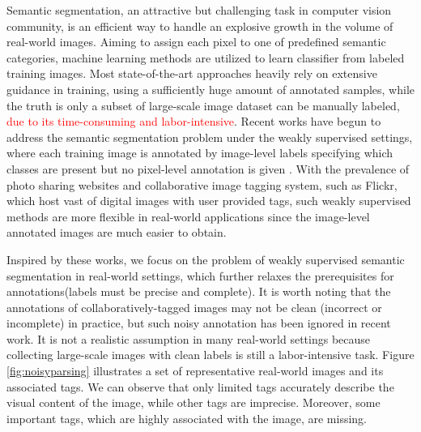 Semantic segmentation, an attractive but challenging task in computer vision community, is an efficient way to handle an explosive growth in the volume of real-world images. Aiming to assign each pixel to one of predefined semantic categories, machine learning methods are utilized to learn classifier from labeled training images. Most state-of-the-art approaches heavily rely on extensive guidance in training, using a sufficiently huge amount of annotated samples, while the truth is only a subset of large-scale image dataset can be manually labeled, \textcolor{red}{due to its time-consuming and labor-intensive}. Recent works have begun to address the semantic segmentation problem under the weakly supervised settings, where each training image is annotated by image-level labels specifying which classes are present but no pixel-level annotation is given \cite{verbeek2007region,vezhnevets2010towards,vezhnevets2011weakly,vezhnevets2012weakly,xu2014tell,zhang2013sparse,zhang2013probabilistic}. With the prevalence of photo sharing websites and collaborative image tagging system, such as Flickr, which host vast of digital images with user provided tags, such weakly supervised methods are more flexible in real-world applications since the image-level annotated images are much easier to obtain.

Inspired by these works, we focus on the problem of weakly supervised semantic segmentation in real-world settings, which further relaxes the prerequisites for annotations(\eg labels must be precise and complete). It is worth noting that the annotations of collaboratively-tagged images may not be clean (incorrect or incomplete) in practice, but such noisy annotation has been ignored in recent work. It is not a realistic assumption in many real-world settings because collecting large-scale images with clean labels is still a labor-intensive task. Figure \ref{fig:noisyparsing} illustrates a set of representative real-world images and its associated tags. We can observe that only limited tags accurately describe the visual content of the image, while other tags are imprecise. Moreover, some important tags, which are highly associated with the image, are missing.

